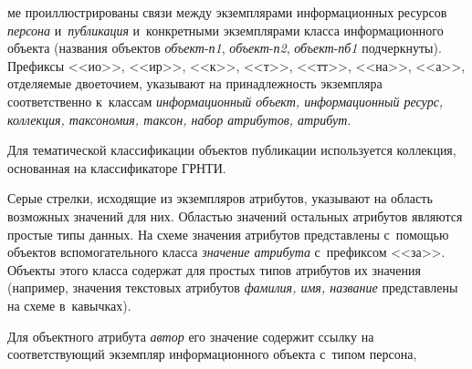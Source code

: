 \begin{multicols}{2}

\noindent 
ме проиллюстрированы связи между экземплярами
информационных ресурсов \textit{персона} и~\textit{публикация} 
и~конкретными экземплярами класса информационного объекта (названия 
объектов \textit{объект}-\textit{п1}, \textit{объект}-\textit{п2},  
\textit{объект}-\textit{пб1} подчеркнуты). Префиксы <<ио>>, <<ир>>, 
<<к>>, <<т>>, <<тт>>, <<на>>, <<а>>, отделяемые двоеточием, 
указывают на принадлежность экземпляра соответственно к~классам 
\textit{информационный объект, информационный ресурс, коллекция, 
таксономия, таксон, набор атрибутов, атрибут}. 

Для тематической 
классификации объектов публикации используется коллекция, основанная на 
классификаторе ГРНТИ. 

        
    Серые стрелки, исходящие из экземпляров атрибутов, указывают на 
область возможных значений для них. Областью значений остальных 
атрибутов являются простые типы данных. На схеме значения атрибутов 
представлены с~помощью объектов вспомогательного класса \textit{значение 
атрибута} с~префиксом <<за>>. Объекты этого класса содержат для 
простых типов атрибутов их значения (например, значения текстовых 
атрибутов \textit{фамилия, имя, название} представлены на схеме 
в~кавычках).

 Для объектного атрибута \textit{автор} его значение содержит 
ссылку на соответствующий экземпляр информационного объекта с~типом 
персона,\linebreak\vspace*{-12pt}

\pagebreak

\end{multicols}

     \begin{figure*} %
      \vspace*{1pt}
\begin{center}
\mbox{%
\epsfxsize=112mm
}
\end{center}
\vspace*{-3pt}
\vspace*{9pt}
\end{figure*}

